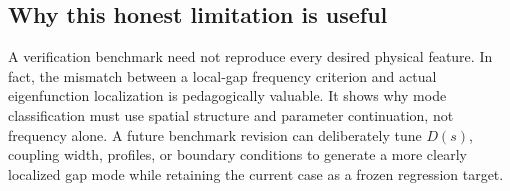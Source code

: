 \subsection{Why this honest limitation is useful}
A verification benchmark need not reproduce every desired physical feature. In fact, the mismatch between a local-gap frequency criterion and actual eigenfunction localization is pedagogically valuable. It shows why mode classification must use spatial structure and parameter continuation, not frequency alone. A future benchmark revision can deliberately tune $D(s)$, coupling width, profiles, or boundary conditions to generate a more clearly localized gap mode while retaining the current case as a frozen regression target.

